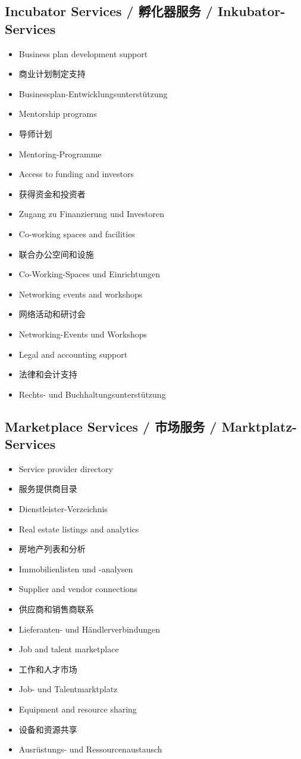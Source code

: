 \subsection{Incubator Services / 孵化器服务 / Inkubator-Services}
\begin{itemize}
    \item Business plan development support
    \item 商业计划制定支持
    \item Businessplan-Entwicklungsunterstützung
    \item Mentorship programs
    \item 导师计划
    \item Mentoring-Programme
    \item Access to funding and investors
    \item 获得资金和投资者
    \item Zugang zu Finanzierung und Investoren
    \item Co-working spaces and facilities
    \item 联合办公空间和设施
    \item Co-Working-Spaces und Einrichtungen
    \item Networking events and workshops
    \item 网络活动和研讨会
    \item Networking-Events und Workshops
    \item Legal and accounting support
    \item 法律和会计支持
    \item Rechts- und Buchhaltungsunterstützung
\end{itemize}

\subsection{Marketplace Services / 市场服务 / Marktplatz-Services}
\begin{itemize}
    \item Service provider directory
    \item 服务提供商目录
    \item Dienstleister-Verzeichnis
    \item Real estate listings and analytics
    \item 房地产列表和分析
    \item Immobilienlisten und -analysen
    \item Supplier and vendor connections
    \item 供应商和销售商联系
    \item Lieferanten- und Händlerverbindungen
    \item Job and talent marketplace
    \item 工作和人才市场
    \item Job- und Talentmarktplatz
    \item Equipment and resource sharing
    \item 设备和资源共享
    \item Ausrüstungs- und Ressourcenaustausch
\end{itemize}


